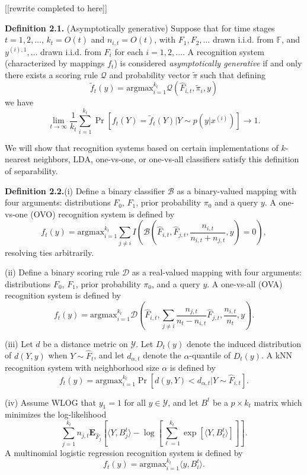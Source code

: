 \documentclass{article}
\newcommand{\E}{\textbf{E}}
\newcommand{\argmax}{\text{argmax}}
\begin{document}
[[rewrite completed to here]]

\textbf{Definition 2.1.}  (Asymptotically generative) Suppose that for
time stages $t = 1,2,\hdots$, $k_t = O(t)$ and $n_{i,t} = O(t)$, with
$F_1,F_2,\hdots$ drawn i.i.d. from $\mathbb{F}$, and
$y^{(i),1},\hdots$ drawn i.i.d. from $F_i$ for each $i = 1,2,\hdots$.
A recognition system (characterized by mappings $f_t$) is considered
\emph{asymptotically generative} if and only there exists a scoring
rule $\mathcal{Q}$ and probability vector $\tilde{\pi}$ such that
defining
\[
\tilde{f}_t(y) = \argmax_{i=1}^{k_t} \mathcal{Q}(\hat{F}_{i, t}, \tilde{\pi}_i, y)
\]
we have
\[
\lim_{t \to \infty} \frac{1}{k_t} \sum_{i=1}^{k_t}\Pr[f_t(Y) = \tilde{f}_t(Y) | Y \sim p(y|x^{(i)})] \to 1.
\]

We will show that recognition systems based on certain implementations
of $k$-nearest neighbors, LDA, one-vs-one, or one-vs-all classifiers
satisfy this definition of separability.

\textbf{Definition 2.2.}(i) Define a binary classifier $\mathcal{B}$
as a binary-valued mapping with four arguments: distributions $F_0$,
$F_1$, prior probability $\pi_0$ and a query $y$.  A one-vs-one (OVO)
recognition system is defined by
\[
f_t(y) = \argmax_{i=1}^{k_t} \sum_{j \neq i} I\left(\mathcal{B}(\hat{F}_{i, t}, \hat{F}_{j, t}, \frac{n_{i, t}}{n_{i, t} + n_{j, t}}, y)=0\right),
\]
resolving ties arbitrarily.

(ii) Define a binary scoring rule $\mathcal{D}$ as a real-valued
mapping with four arguments: distributions $F_0$, $F_1$, prior
probability $\pi_0$, and a query $y$.  A one-vs-all (OVA) recognition
system is defined by
\[
f_t(y) = \argmax_{i=1}^{k_t} \mathcal{D}\left(\hat{F}_{i, t},
\sum_{j\neq i} \frac{n_{j, t}}{n_t - n_{i, t}}\hat{F}_{j, t},
\frac{n_{i, t}}{n_t}, y\right).
\]

(iii) Let $d$ be a distance metric on $\mathcal{Y}$.  Let $D_t(y)$
denote the induced distribution of $d(Y, y)$ when $Y \sim \hat{F}_t$,
and let $d_{\alpha, t}$ denote the $\alpha$-quantile of $D_t(y)$.  A
kNN recognition system with neighborhood size $\alpha$ is defined by
\[
f_t(y) = \argmax_{i=1}^{k_t} \Pr[d(y, Y) < d_{\alpha, t} |Y \sim \hat{F}_{i, t}].
\]

(iv) Assume WLOG that $y_1 = 1$ for all $y \in \mathcal{Y}$, and let
$B^t$ be a $p \times k_t$ matrix which minimizes the log-likelihood
\[
\sum_{j=1}^{k_t}n_{j, t}\E_{\hat{F}_j}\left[\langle Y, B^t_j \rangle - \log\left[\sum_{\ell=1}^{k_t} \exp[\langle Y, B^t_\ell \rangle]\right]\right].
\]
A multinomial logistic regression recognition system is defined by
\[
f_t(y) = \argmax_{i=1}^{k_t} \langle y, B^t_i\rangle.
\]
\end{document}
